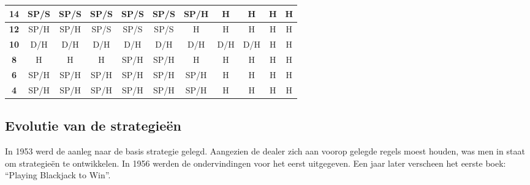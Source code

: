 \documentclass[conference]{IEEEtran}
\begin{document}
\begin{table}[htbp]
\begin{tabular}{|c|c|c|c|c|c|c|c|c|c|c|}
\textbf{14} & \cellcolor[HTML]{F8FF00}SP/S & \cellcolor[HTML]{F8FF00}SP/S & \cellcolor[HTML]{F8FF00}SP/S & \cellcolor[HTML]{F8FF00}SP/S & \cellcolor[HTML]{F8FF00}SP/S & \cellcolor[HTML]{F8FF00}SP/H & \cellcolor[HTML]{FE0000}H & \cellcolor[HTML]{FE0000}H & \cellcolor[HTML]{FE0000}H & \cellcolor[HTML]{FE0000}H \\ \hline
\textbf{12} & \cellcolor[HTML]{F8FF00}SP/H & \cellcolor[HTML]{F8FF00}SP/H & \cellcolor[HTML]{F8FF00}SP/S & \cellcolor[HTML]{F8FF00}SP/S & \cellcolor[HTML]{F8FF00}SP/S & \cellcolor[HTML]{FE0000}H & \cellcolor[HTML]{FE0000}H & \cellcolor[HTML]{FE0000}H & \cellcolor[HTML]{FE0000}H & \cellcolor[HTML]{FE0000}H \\ \hline
\textbf{10} & \cellcolor[HTML]{FFC702}D/H & \cellcolor[HTML]{FFC702}D/H & \cellcolor[HTML]{FFC702}D/H & \cellcolor[HTML]{FFC702}D/H & \cellcolor[HTML]{FFC702}D/H & \cellcolor[HTML]{FFC702}D/H & \cellcolor[HTML]{FFC702}D/H & \cellcolor[HTML]{FFC702}D/H & \cellcolor[HTML]{FE0000}H & \cellcolor[HTML]{FE0000}H \\ \hline
\textbf{8} & \cellcolor[HTML]{FE0000}H & \cellcolor[HTML]{FE0000}H & \cellcolor[HTML]{FE0000}H & \cellcolor[HTML]{F8FF00}SP/H & \cellcolor[HTML]{F8FF00}SP/H & \cellcolor[HTML]{FE0000}H & \cellcolor[HTML]{FE0000}H & \cellcolor[HTML]{FE0000}H & \cellcolor[HTML]{FE0000}H & \cellcolor[HTML]{FE0000}H \\ \hline
\textbf{6} & \cellcolor[HTML]{F8FF00}SP/H & \cellcolor[HTML]{F8FF00}SP/H & \cellcolor[HTML]{F8FF00}SP/H & \cellcolor[HTML]{F8FF00}SP/H & \cellcolor[HTML]{F8FF00}SP/H & \cellcolor[HTML]{F8FF00}SP/H & \cellcolor[HTML]{FE0000}H & \cellcolor[HTML]{FE0000}H & \cellcolor[HTML]{FE0000}H & \cellcolor[HTML]{FE0000}H \\ \hline
\textbf{4} & \cellcolor[HTML]{F8FF00}SP/H & \cellcolor[HTML]{F8FF00}SP/H & \cellcolor[HTML]{F8FF00}SP/H & \cellcolor[HTML]{F8FF00}SP/H & \cellcolor[HTML]{F8FF00}SP/H & \cellcolor[HTML]{F8FF00}SP/H & \cellcolor[HTML]{FE0000}H & \cellcolor[HTML]{FE0000}H & \cellcolor[HTML]{FE0000}H & \cellcolor[HTML]{FE0000}H \\ \hline
\end{tabular}
\end{table}








\subsection{Evolutie van de strategie\"{e}n}
 In 1953 werd de aanleg naar de basis strategie gelegd. Aangezien de dealer zich aan voorop gelegde regels moest houden, was men in staat om strategie\"{e}n te ontwikkelen. In 1956 werden de ondervindingen voor het eerst uitgegeven. Een jaar later verscheen het eerste boek: “Playing Blackjack to Win”. 
\end{document}
